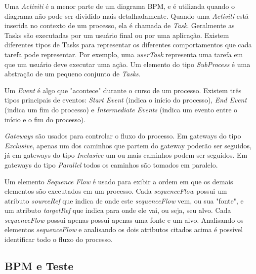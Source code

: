 \documentclass[12pt]{article}
\begin{document}
Uma \emph{Activiti} é a menor parte de um diagrama BPM, e é utilizada quando o diagrama não pode ser dividido mais detalhadamente. Quando uma \emph{Activiti} está inserida no contexto de um processo, ela é chamada de \emph{Task}. Geralmente as Tasks são executadas por um usuário final ou por uma aplicação. Existem diferentes tipos de Tasks para representar os diferentes comportamentos que cada tarefa pode representar. Por exemplo, uma \emph{userTask} representa uma tarefa em que um usuário deve executar uma ação. Um elemento do tipo \emph{SubProcess} é uma abstração de um pequeno conjunto de \emph{Tasks}.

Um \emph{Event} é algo que "acontece" durante o curso de um processo\cite{model2011notation}. Existem três tipos principais de eventos: \emph{Start Event} (indica o início do processo), \emph{End Event} (indica um fim do processo) e \emph{Intermediate Events} (indica um evento entre o início e o fim do processo).

\emph{Gateways} são usados para controlar o fluxo do processo. Em gateways do tipo \emph{Exclusive}, apenas um dos caminhos que partem do gateway poderão ser seguidos, já em gateways do tipo \emph{Inclusive} um ou mais caminhos podem ser seguidos. Em gateways do tipo \emph{Parallel} todos os caminhos são tomados em paralelo.


Um elemento \emph{Sequence Flow} é usado para exibir a ordem em que os demais elementos são executados em um processo. Cada \emph{sequenceFlow} possui um atributo \emph{sourceRef} que indica de onde este \emph{sequenceFlow} vem, ou sua "fonte", e um atributo \emph{targetRef} que indica para onde ele vai, ou seja, seu alvo. Cada \emph{sequenceFlow} possui apenas possui apenas uma fonte e um alvo. Analisando os elementos \emph{sequenceFlow} e analisando os dois atributos citados acima é possível identificar todo o fluxo do processo.

\subsection{BPM e Teste}
\end{document}
